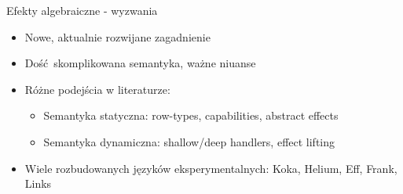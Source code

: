 \documentclass{beamer}
\begin{document}
\begin{frame}{Efekty algebraiczne - wyzwania}
  \begin{itemize}
    \item Nowe, aktualnie rozwijane zagadnienie
    \item Dość skomplikowana semantyka, ważne niuanse 
    \item Różne podejścia w literaturze:
    \begin{itemize}
      \item Semantyka statyczna: row-types, capabilities, abstract effects
      \item Semantyka dynamiczna: shallow/deep handlers, effect lifting
    \end{itemize}
    \item Wiele rozbudowanych języków eksperymentalnych: Koka, Helium, Eff, Frank, Links
  \end{itemize}
\end{frame}


\end{document}
